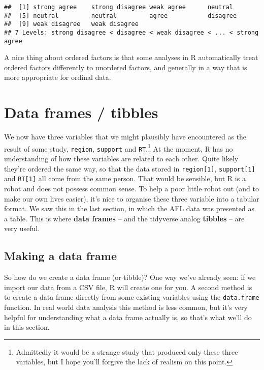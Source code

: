 \documentclass[]{book}
\let\rmarkdownfootnote\footnote%
\def\footnote{\protect\rmarkdownfootnote}
\begin{document}
\begin{verbatim}
##  [1] strong agree    strong disagree weak agree      neutral        
##  [5] neutral         neutral         agree           disagree       
##  [9] weak disagree   weak disagree  
## 7 Levels: strong disagree < disagree < weak disagree < ... < strong agree
\end{verbatim}

A nice thing about ordered factors is that some analyses in R automatically treat ordered factors differently to unordered factors, and generally in a way that is more appropriate for ordinal data.

\hypertarget{data-frames-tibbles}{%
\section{Data frames / tibbles}\label{data-frames-tibbles}}

We now have three variables that we might plausibly have encountered as the result of some study, \texttt{region}, \texttt{support} and \texttt{RT}.\footnote{Admittedly it would be a strange study that produced only these three variables, but I hope you'll forgive the lack of realism on this point.} At the moment, R has no understanding of how these variables are related to each other. Quite likely they're ordered the same way, so that the data stored in \texttt{region{[}1{]}}, \texttt{support{[}1{]}} and \texttt{RT{[}1{]}} all come from the same person. That would be sensible, but R is a robot and does not possess common sense. To help a poor little robot out (and to make our own lives easier), it's nice to organise these three variable into a tabular format. We saw this in the last section, in which the AFL data was presented as a table. This is where \textbf{data frames} -- and the tidyverse analog \textbf{tibbles} -- are very useful.

\hypertarget{making-a-data-frame}{%
\subsection{Making a data frame}\label{making-a-data-frame}}

So how do we create a data frame (or tibble)? One way we've already seen: if we import our data from a CSV file, R will create one for you. A second method is to create a data frame directly from some existing variables using the \texttt{data.frame} function. In real world data analysis this method is less common, but it's very helpful for understanding what a data frame actually is, so that's what we'll do in this section.
\end{document}
